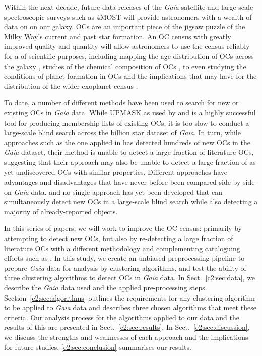 Within the next decade, future data releases of the \emph{Gaia} satellite and large-scale spectroscopic surveys such as 4MOST \citep{de_jong_4most_2012} will provide astronomers with a wealth of data on on our galaxy. OCs are an important piece of the jigsaw puzzle of the Milky Way's current and past star formation. An OC census with greatly improved quality and quantity will allow astronomers to use the census reliably for a of scientific purposes, including mapping the age distribution of OCs across the galaxy \citep{cantat-gaudin_painting_2020, yen_reanalysis_2018}, studies of the chemical composition of OCs \citep{baratella_gaia-eso_2020, donor_open_2020}, to even studying the conditions of planet formation in OCs and the implications that may have for the distribution of the wider exoplanet census \citep{fujii_survival_2019}.

To date, a number of different methods have been used to search for new or existing OCs in \emph{Gaia} data. While UPMASK \citep[Unsupervised Photometric Membership Assignment in Stellar Clusters,][]{krone-martins_upmask:_2014} as used by \cite{cantat-gaudin_gaia_2018} and \cite{cantat-gaudin_clusters_2020} is a highly successful tool for producing membership lists of existing OCs, it is too slow to conduct a large-scale blind search across the billion star dataset of \emph{Gaia}. In turn, while approaches such as the one applied in \cite{castro-ginard_hunting_2020} has detected hundreds of new OCs in the \emph{Gaia} dataset, their method is unable to detect a large fraction of literature OCs, suggesting that their approach may also be unable to detect a large fraction of as yet undiscovered OCs with similar properties. Different approaches have advantages and disadvantages that have never before been compared side-by-side on \emph{Gaia} data, and no single approach has yet been developed that can simultaneously detect new OCs in a large-scale blind search while also detecting a majority of already-reported objects.

In this series of papers, we will work to improve the OC census: primarily by attempting to detect new OCs, but also by re-detecting a large fraction of literature OCs with a different methodology and complementing cataloguing efforts such as \cite{cantat-gaudin_clusters_2020}. In this study, we create an unbiased preprocessing pipeline to prepare \emph{Gaia} data for analysis by clustering algorithms, and test the ability of three clustering algorithms to detect OCs in \emph{Gaia} data. In Sect.~\ref{c2:sec:data}, we describe the \emph{Gaia} data used and the applied pre-processing steps. Section~\ref{c2:sec:algorithms} outlines the requirements for any clustering algorithm to be applied to \emph{Gaia} data and describes three chosen algorithms that meet these criteria. Our analysis process for the algorithms applied to our data and the results of this are presented in Sect.~\ref{c2:sec:results}. In Sect.~\ref{c2:sec:discussion}, we discuss the strengths and weaknesses of each approach and the implications for future studies. \ref{c2:sec:conclusion} summarises our results.



